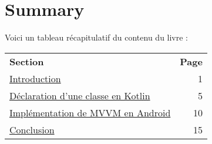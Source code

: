 \section*{Summary}\label{sec:summary}
\hypertarget{page:summary}{}
Voici un tableau récapitulatif du contenu du livre :

\begin{tabularx}{\textwidth}{@{}Xr@{}} %
\textbf{Section} & \textbf{Page} \\
\addlinespace[0.5ex] %
\hyperref[sec:intro]{Introduction} \dotfill & 1 \\
\hyperref[sec:classes]{Déclaration d'une classe en Kotlin} \dotfill & 5 \\
\hyperref[sec:mvvm]{Implémentation de MVVM en Android} \dotfill & 10 \\
\hyperref[sec:conclusion]{Conclusion} \dotfill & 15 \\
\end{tabularx}